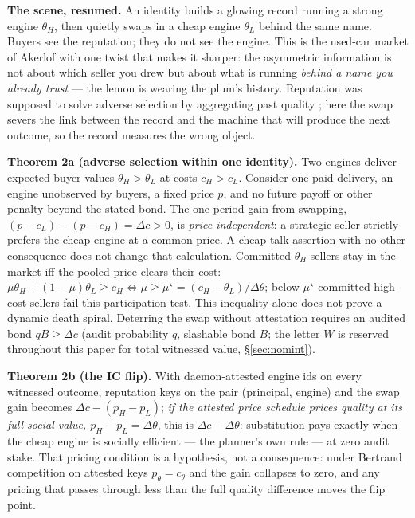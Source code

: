 \documentclass[11pt,a4paper]{article}
\begin{document}
\textbf{The scene, resumed.} An identity builds a glowing record running a strong engine $\theta_H$, then quietly swaps in a cheap
engine $\theta_L$ behind the same name. Buyers see the reputation; they do not see the engine. This is the used-car market of
Akerlof \cite{akerlof} with one twist that makes it sharper: the asymmetric information is not about which seller you drew but
about what is running \emph{behind a name you already trust} --- the lemon is wearing the plum's history. Reputation was supposed
to solve adverse selection by aggregating past quality \cite{mailath-samuelson}; here the swap severs the link between the record
and the machine that will produce the next outcome, so the record measures the wrong object.

\begin{thebox}
\textbf{Theorem 2a (adverse selection within one identity).} Two engines deliver expected buyer values $\theta_H>\theta_L$ at costs $c_H>c_L$. Consider one paid delivery, an engine unobserved by buyers, a fixed price $p$, and no future payoff or other penalty beyond the stated bond. The one-period gain from swapping, $(p-c_L)-(p-c_H)=\Delta c>0$, is \emph{price-independent}: a strategic seller strictly prefers the cheap engine at a common price. A cheap-talk assertion with no other consequence does not change that calculation. Committed $\theta_H$ sellers stay in the market iff the pooled price clears their cost:
$\mu\theta_H+(1-\mu)\theta_L\ge c_H\iff \mu\ge\mu^\star=(c_H-\theta_L)/\Delta\theta$; below $\mu^\star$ committed high-cost sellers fail this participation test. This inequality alone does not prove a dynamic death spiral. Deterring the swap without attestation requires an audited bond $qB\ge\Delta c$ (audit
probability $q$, slashable bond $B$; the letter $W$ is reserved throughout this paper for total witnessed value,
\S\ref{sec:nomint}).

\textbf{Theorem 2b (the IC flip).} With daemon-attested engine ids on every witnessed outcome, reputation keys on the pair
(principal, engine) and the swap gain becomes $\Delta c-(p_H-p_L)$; \emph{if the attested price schedule prices quality at its
full social value, $p_H-p_L=\Delta\theta$}, this is $\Delta c-\Delta\theta$: substitution pays exactly when the cheap engine is
socially efficient --- the planner's own rule --- at zero audit stake. That pricing condition is a hypothesis, not a
consequence: under Bertrand competition on attested keys $p_\theta=c_\theta$ and the gain collapses to zero, and any pricing that
passes through less than the full quality difference moves the flip point.


\end{thebox}
\end{document}
